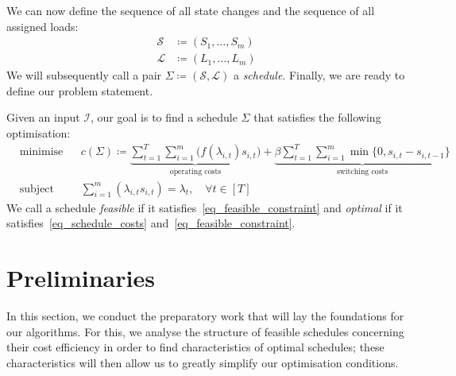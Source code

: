 \documentclass[hidelinks]{article}
\theoremstyle{plain}
\theoremstyle{definition}
\theoremstyle{rem}
\newcommand{\inp}{\mathcal{I}}
\newcommand{\costs}{c}
\begin{document}
We can now define the sequence of all state changes and the sequence of all assigned loads:
\begin{align*}
	\mathcal{S}&\coloneqq(S_1,\ldots,S_m)\\
	\mathcal{L}&\coloneqq(L_1,\ldots,L_m)
\end{align*}
We will subsequently call a pair $\Sigma\coloneqq(\mathcal{S},\mathcal{L})$ a \textit{schedule}. Finally, we are ready to define our problem statement.

Given an input $\inp$, our goal is to find a schedule $\Sigma$ that satisfies the following optimisation:
\begin{align}
	&\text{minimise}&&\costs(\Sigma)\coloneqq\underbrace{\sum\limits_{t=1}^{T}\sum\limits_{i=1}^{m}\bigl(f(\lambda_{i,t}) s_{i,t}\bigr)}_{\text{operating costs}}+\underbrace{\beta\sum\limits_{t=1}^{T}\sum\limits_{i=1}^{m}\min\{0,s_{i,t}-s_{i,t-1}\}}_{\text{switching costs}}\label{eq_schedule_costs}\\ 
	&\text{subject to}&&\sum\limits_{i=1}^{m}(\lambda_{i,t} s_{i,t})=\lambda_t,\quad \forall t\in[T]\label{eq_feasible_constraint}
\end{align}
We call a schedule \textit{feasible} if it satisfies~\eqref{eq_feasible_constraint} and \textit{optimal} if it satisfies~\eqref{eq_schedule_costs} and~\eqref{eq_feasible_constraint}.
\section{Preliminaries}
In this section, we conduct the preparatory work that will lay the foundations for our algorithms. For this, we analyse the structure of feasible schedules concerning their cost efficiency in order to find characteristics of optimal schedules; these characteristics will then allow us to greatly simplify our optimisation conditions.
\end{document}
